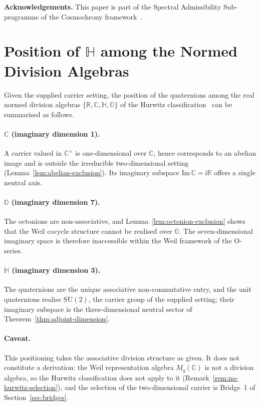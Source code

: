 \documentclass[11pt,a4paper]{article}
\newcommand{\SU}{\mathrm{SU}}
\begin{document}
  \bigskip
  \noindent
  \textbf{Acknowledgements.}
  This paper is part of the Spectral Admissibility Sub-programme of the Cosmochrony
  framework~\cite{Cosmochrony}.

  \appendix

  \section{Position of $\mathbb{H}$ among the Normed Division Algebras}
  \label{app:not-2-not-7}

  Given the supplied carrier setting, the position of the quaternions among the real
  normed division algebras $\{\mathbb{R}, \mathbb{C}, \mathbb{H}, \mathbb{O}\}$ of the
  Hurwitz classification~\cite{Hurwitz1898} can be summarised as follows.

  \paragraph{$\mathbb{C}$ (imaginary dimension 1).}
    A carrier valued in $\mathbb{C}^{\times}$ is one-dimensional over $\mathbb{C}$, hence
    corresponds to an abelian image and is outside the irreducible two-dimensional
    setting (Lemma~\ref{lem:abelian-exclusion}).
    Its imaginary subspace $\mathrm{Im}\,\mathbb{C} = \mathrm{i}\mathbb{R}$ offers a
    single neutral axis.

  \paragraph{$\mathbb{O}$ (imaginary dimension 7).}
    The octonions are non-associative, and Lemma~\ref{lem:octonion-exclusion} shows that
    the Weil cocycle structure cannot be realised over $\mathbb{O}$.
    The seven-dimensional imaginary space is therefore inaccessible within the Weil
    framework of the O-series.

  \paragraph{$\mathbb{H}$ (imaginary dimension 3).}
    The quaternions are the unique associative non-commutative entry, and the unit
    quaternions realise $\SU(2)$, the carrier group of the supplied setting; their
    imaginary subspace is the three-dimensional neutral sector of
    Theorem~\ref{thm:adjoint-dimension}.

  \paragraph{Caveat.}
    This positioning takes the associative division structure as given.
    It does not constitute a derivation: the Weil representation algebra
    $M_{q}(\mathbb{C})$ is not a division algebra, so the Hurwitz classification does not
    apply to it (Remark~\ref{rem:no-hurwitz-selection}), and the selection of the
    two-dimensional carrier is Bridge~1 of Section~\ref{sec:bridges}.

    \clearpage
    
    
\end{document}
